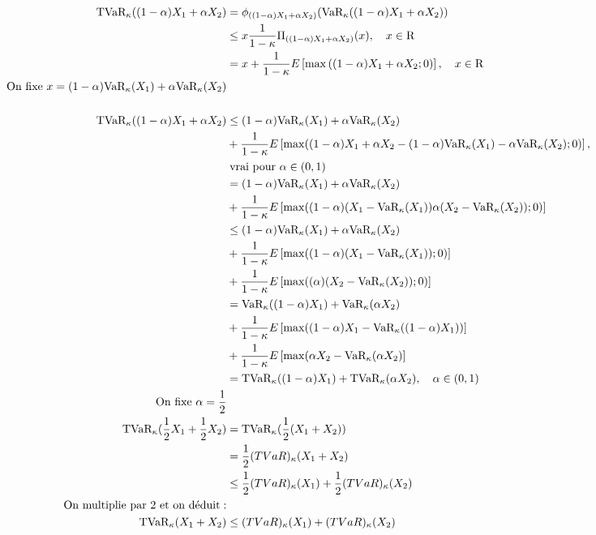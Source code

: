 \begin{align*}
\text{TVaR}_\kappa((1-\alpha)X_1+\alpha X_2)& = \phi_{((1-\alpha)X_1+\alpha X_2)}(\text{VaR}_\kappa((1-\alpha)X_1+\alpha X_2))\\
& \leq x\frac{1}{1-\kappa}\Pi_{((1-\alpha)X_1+\alpha X_2)}(x),\quad x\in\mathrm{R}\\
& =x+\frac{1}{1-\kappa}E\left[ \max\left((1-\alpha)X_1+\alpha X_2;0\right)\right],\quad x\in\mathrm{R}\\
\text{On fixe }x=(1-\alpha)\text{VaR}_\kappa(X_1)+\alpha \text{VaR}_\kappa(X_2)\\
\\
\text{TVaR}_\kappa((1-\alpha)X_1+\alpha X_2)& \leq (1-\alpha)\text{VaR}_\kappa(X_1)+\alpha \text{VaR}_\kappa(X_2)\\
& +\frac{1}{1-\kappa}E\left[ \max((1-\alpha)X_1+\alpha X_2-(1-\alpha)\text{VaR}_\kappa(X_1)
-\alpha \text{VaR}_\kappa(X_2);0)\right],\\
&\;\text{vrai pour }\alpha\in(0,1)\\
& =(1-\alpha)\text{VaR}_\kappa(X_1)+\alpha \text{VaR}_\kappa(X_2)\\
& +\frac{1}{1-\kappa}E\left[ \max((1-\alpha)(X_1-\text{VaR}_\kappa(X_1))\alpha (X_2-\text{VaR}_\kappa(X_2));0)\right]\\
& \leq (1-\alpha)\text{VaR}_\kappa(X_1)+\alpha \text{VaR}_\kappa(X_2)\\
& +\frac{1}{1-\kappa}E\left[\max((1-\alpha)(X_1-\text{VaR}_\kappa(X_1));0)\right]\\
& +\frac{1}{1-\kappa}E\left[\max((\alpha)(X_2-\text{VaR}_\kappa(X_2));0)\right]\\
& = \text{VaR}_\kappa((1-\alpha)X_1)+\text{VaR}_\kappa(\alpha X_2)\\
& +\frac{1}{1-\kappa}E\left[\max((1-\alpha)X_1-\text{VaR}_\kappa((1-\alpha)X_1))\right]\\
& +\frac{1}{1-\kappa}E\left[\max(\alpha X_2-\text{VaR}_\kappa(\alpha X_2)\right]\\
& =\text{TVaR}_\kappa((1-\alpha)X_1)+\text{TVaR}_\kappa(\alpha X_2),\quad \alpha\in(0,1)\\
\text{On fixe }\alpha=\frac{1}{2}\\
\text{TVaR}_\kappa(\frac{1}{2} X_1+\frac{1}{2} X_2)& =\text{TVaR}_\kappa(\frac{1}{2}(X_1+X_2))\\
& =\frac{1}{2}\text(TVaR)_\kappa(X_1+X_2)\\
& \leq \frac{1}{2}\text(TVaR)_\kappa(X_1)+\frac{1}{2}\text(TVaR)_\kappa(X_2)\\
\text{On multiplie par 2 et on déduit}:\\
\text{TVaR}_\kappa(X_1+X_2)& \leq \text(TVaR)_\kappa(X_1)+\text(TVaR)_\kappa(X_2)
\end{align*}

